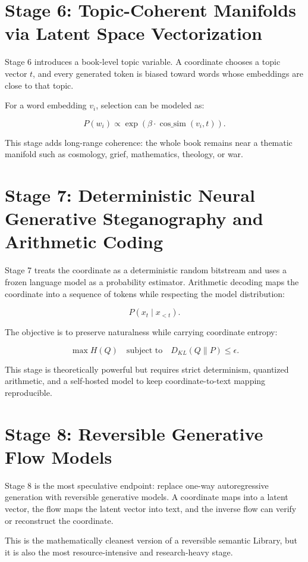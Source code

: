 \documentclass[11pt,a4paper]{article}
\begin{document}
\section{Stage 6: Topic-Coherent Manifolds via Latent Space Vectorization}

Stage 6 introduces a book-level topic variable. A coordinate chooses a topic vector $t$, and every generated token is biased toward words whose embeddings are close to that topic.

For a word embedding $v_i$, selection can be modeled as:

\[
P(w_i) \propto \exp\left(\beta \cdot \operatorname{cos\_sim}(v_i,t)\right).
\]

This stage adds long-range coherence: the whole book remains near a thematic manifold such as cosmology, grief, mathematics, theology, or war.

\section{Stage 7: Deterministic Neural Generative Steganography and Arithmetic Coding}

Stage 7 treats the coordinate as a deterministic random bitstream and uses a frozen language model as a probability estimator. Arithmetic decoding maps the coordinate into a sequence of tokens while respecting the model distribution:

\[
P(x_t \mid x_{<t}).
\]

The objective is to preserve naturalness while carrying coordinate entropy:

\[
\max H(Q) \quad \text{subject to} \quad D_{KL}(Q \parallel P) \leq \epsilon.
\]

This stage is theoretically powerful but requires strict determinism, quantized arithmetic, and a self-hosted model to keep coordinate-to-text mapping reproducible.

\section{Stage 8: Reversible Generative Flow Models}

Stage 8 is the most speculative endpoint: replace one-way autoregressive generation with reversible generative models. A coordinate maps into a latent vector, the flow maps the latent vector into text, and the inverse flow can verify or reconstruct the coordinate.

This is the mathematically cleanest version of a reversible semantic Library, but it is also the most resource-intensive and research-heavy stage.
\end{document}
